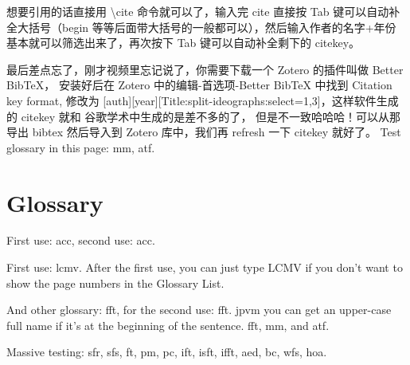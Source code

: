 想要引用的话直接用 \textbackslash cite 命令就可以了，输入完 cite 直接按 Tab
键可以自动补全大括号（begin 等等后面带大括号的一般都可以），然后输入作者的名字+年份
基本就可以筛选出来了，再次按下 Tab 键可以自动补全剩下的 citekey\cite{Malmkjaer2017TheRoutledgeHandbook,TanXueLan2019DangDaiYi}。

最后差点忘了，刚才视频里忘记说了，你需要下载一个 Zotero 的插件叫做 Better BibTeX，
安装好后在 Zotero 中的编辑-首选项-Better BibTeX 中找到 Citation key format, 
修改为 [auth][year][Title:split-ideographs:select=1,3]，这样软件生成的 citekey 就和
谷歌学术中生成的是差不多的了\cite{WangBinHua2019KouYiLi,XuMing2016YiShiChang}，
但是不一致哈哈哈！可以从那导出 bibtex 然后导入到 Zotero 库中，我们再 refresh 一下 citekey 就好了。 Test glossary in this page: \gls{mm}, \gls{atf}.

\section{Glossary}
First use: \gls{acc}, second use: \gls{acc}.

First use: \gls{lcmv}. After the first use, you can just type LCMV if you don't want to show the page numbers in the Glossary List.

And other glossary: \gls{fft}, for the second use: \gls{fft}. \Gls{jpvm} you can get an upper-case full name if it's at the beginning of the sentence. \gls{fft}, \gls{mm}, and \gls{atf}.

Massive testing: \Gls{sfr}, \gls{sfs}, \gls{ft}, \gls{pm}, \gls{pc}, \gls{ift}, \gls{isft}, \gls{ifft}, \gls{aed}, \gls{bc}, \gls{wfs}, \gls{hoa}.

\clearpage %

